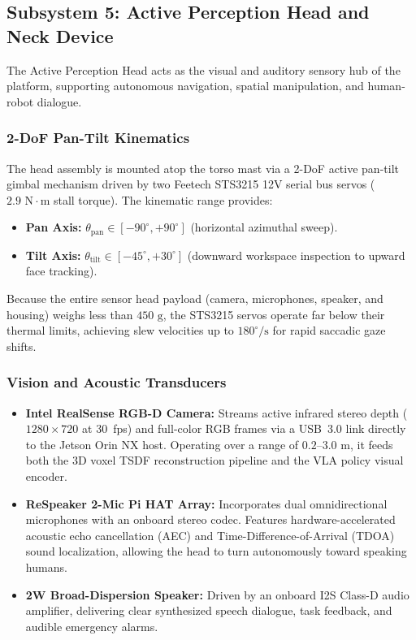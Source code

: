 \subsection{Subsystem 5: Active Perception Head and Neck Device}
\label{subsec:subsystem_5_head}
The Active Perception Head acts as the visual and auditory sensory hub of the platform, supporting autonomous navigation, spatial manipulation, and human-robot dialogue.

\subsubsection{2-DoF Pan-Tilt Kinematics}
The head assembly is mounted atop the torso mast via a 2-DoF active pan-tilt gimbal mechanism driven by two Feetech STS3215 12V serial bus servos ($2.9\text{ N}\cdot\text{m}$ stall torque). The kinematic range provides:
\begin{itemize}[leftmargin=1.5em]
  \item \textbf{Pan Axis:} $\theta_{\text{pan}} \in [-90^\circ, +90^\circ]$ (horizontal azimuthal sweep).
  \item \textbf{Tilt Axis:} $\theta_{\text{tilt}} \in [-45^\circ, +30^\circ]$ (downward workspace inspection to upward face tracking).
\end{itemize}
Because the entire sensor head payload (camera, microphones, speaker, and housing) weighs less than $450\text{ g}$, the STS3215 servos operate far below their thermal limits, achieving slew velocities up to $180^\circ/\text{s}$ for rapid saccadic gaze shifts.

\subsubsection{Vision and Acoustic Transducers}
\begin{itemize}[leftmargin=1.5em]
  \item \textbf{Intel RealSense RGB-D Camera:} Streams active infrared stereo depth ($1280 \times 720$ at 30~fps) and full-color RGB frames via a USB~3.0 link directly to the Jetson Orin NX host. Operating over a range of $0.2\text{--}3.0\text{ m}$, it feeds both the 3D voxel TSDF reconstruction pipeline and the VLA policy visual encoder.
  \item \textbf{ReSpeaker 2-Mic Pi HAT Array:} Incorporates dual omnidirectional microphones with an onboard stereo codec. Features hardware-accelerated acoustic echo cancellation (AEC) and Time-Difference-of-Arrival (TDOA) sound localization, allowing the head to turn autonomously toward speaking humans.
  \item \textbf{2W Broad-Dispersion Speaker:} Driven by an onboard I2S Class-D audio amplifier, delivering clear synthesized speech dialogue, task feedback, and audible emergency alarms.
\end{itemize}

